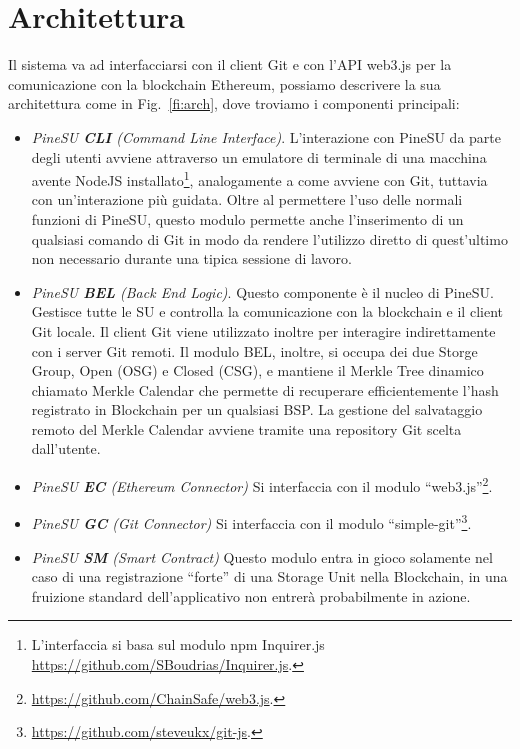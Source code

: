 \section {Architettura}
\indent
Il sistema va ad interfacciarsi con il client Git e con l’API web3.js per la comunicazione
con la blockchain Ethereum, possiamo descrivere la sua architettura come in Fig.~\ref{fi:arch}, dove troviamo i componenti principali:
\begin{itemize}
    \item \emph{PineSU \textbf{CLI} (Command Line Interface)}. L'interazione con PineSU da parte degli utenti avviene attraverso un emulatore di terminale di una macchina avente NodeJS installato\footnote{L'interfaccia si basa sul modulo npm Inquirer.js \url{https://github.com/SBoudrias/Inquirer.js}.}, analogamente a come avviene con Git, tuttavia con un'interazione più guidata. Oltre al permettere l'uso delle normali funzioni di PineSU, questo modulo permette anche l'inserimento di un qualsiasi comando di Git in modo da rendere l'utilizzo diretto di quest'ultimo non necessario durante una tipica sessione di lavoro.
    \item \emph{PineSU \textbf{BEL} (Back End Logic)}. Questo componente è il nucleo di PineSU. Gestisce tutte le SU e controlla la comunicazione con la blockchain e il client Git locale.
    Il client Git viene utilizzato inoltre per interagire indirettamente con i server Git remoti.
    Il modulo BEL, inoltre, si occupa dei due Storge Group, Open (OSG) e Closed (CSG), e
    mantiene il Merkle Tree dinamico chiamato Merkle Calendar che permette di recuperare efficientemente
    l'hash registrato in Blockchain per un qualsiasi BSP. La gestione del salvataggio remoto del Merkle Calendar avviene tramite una repository Git scelta dall'utente.
    \item \emph{PineSU \textbf{EC} (Ethereum Connector)} Si interfaccia con il modulo “web3.js”\footnote{\url{https://github.com/ChainSafe/web3.js}.}. 
    \item \emph{PineSU \textbf{GC} (Git Connector)} Si interfaccia con il modulo “simple-git”\footnote{\url{https://github.com/steveukx/git-js}.}. 
    \item \emph{PineSU \textbf{SM} (Smart Contract)} Questo modulo entra in gioco solamente nel caso di una registrazione “forte” di una Storage Unit nella Blockchain, in una fruizione standard dell’applicativo non entrerà probabilmente in azione.
\end{itemize}

